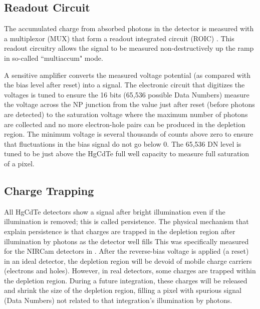 \documentclass{aastex62}
\begin{document}
\subsection{Readout Circuit}\label{sec:readout}

The accumulated charge from absorbed photons in the detector is measured with a multiplexor (MUX) that form a readout integrated circuit (ROIC) \citep{rieke2007irDetectorReview}.
This readout circuitry allows the signal to be measured non-destructively up the ramp in so-called ``multiaccum" mode.

A sensitive amplifier converts the measured voltage potential (as compared with the bias level after reset) into a signal.
The electronic circuit that digitizes the voltages is tuned to ensure the 16 bits (65,536 possible Data Numbers) measure the voltage across the NP junction from the value just after reset (before photons are detected) to the saturation voltage where the maximum number of photons are collected and no more electron-hole pairs can be produced in the depletion region.
The minimum voltage is several thousands of counts above zero to ensure that fluctuations in the bias signal do not go below 0.
The 65,536 DN level is tuned to be just above the HgCdTe full well capacity to measure full saturation of a pixel.




\subsection{Charge Trapping}
All HgCdTe detectors show a signal after bright illumination even if the illumination is removed; this is called persistence.
The physical mechanism that explain persistence is that charges are trapped in the depletion region after illumination by photons as the detector well fills \citep{smith2008imgPersistence}
This was specifically measured for the NIRCam detectors in \citet{leisenring2016persistence}.
After the reverse-bias voltage is applied (a reset) in an ideal detector, the depletion region will be devoid of mobile charge carriers (electrons and holes).
However, in real detectors, some charges are trapped within the depletion region.
During a future integration, these charges will be released and shrink the size of the depletion region, filling a pixel with spurious signal (Data Numbers) not related to that integration's illumination by photons.
\end{document}
